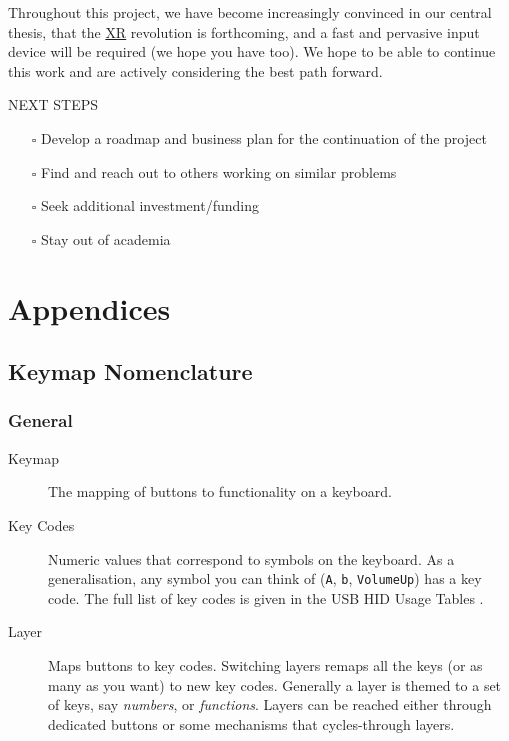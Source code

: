 \documentclass[logo,bsc,singlespacing,parskip]{infthesis}
\begin{document}
Throughout this project, we have become increasingly convinced in our central thesis, that the \hyperref[org39cbd51]{XR} revolution is forthcoming, and a fast and pervasive input device will be required (we hope you have too).
We hope to be able to continue this work and are actively considering the best path forward.

\begin{mdframed}
\begin{description}
\item[{NEXT STEPS}] 
\end{description}


\begin{itemize}
\item[{$\square$}] Develop a roadmap and business plan for the continuation of the project
\item[{$\square$}] Find and reach out to others working on similar problems
\item[{$\square$}] Seek additional investment/funding
\item[{$\square$}] Stay out of academia
\end{itemize}
\end{mdframed}

\printbibliography
{}
\part{Appendices}
\label{sec:org7d6c265}
\appendix
\chapter{Keymap Nomenclature}
\label{sec:org807f536}
\section{General}
\label{sec:org17043cc}
\begin{mdframed}
\begin{description}
\item[{Keymap}] The mapping of buttons to functionality on a keyboard.
\item[{Key Codes}] Numeric values that correspond to symbols on the keyboard.
As a generalisation, any symbol you can think of (\texttt{A}, \texttt{b}, \texttt{VolumeUp}) has a key code.
The full list of key codes is given in the USB HID Usage Tables \autocite{mcgowanUniversalSerialBus2004}.
\item[{Layer}] Maps buttons to key codes.
Switching layers remaps all the keys (or as many as you want) to new key codes.
Generally a layer is themed to a set of keys, say \emph{numbers}, or \emph{functions}.
Layers can be reached either through dedicated buttons or some mechanisms that cycles-through layers.
\end{description}
\end{mdframed}
\end{document}
